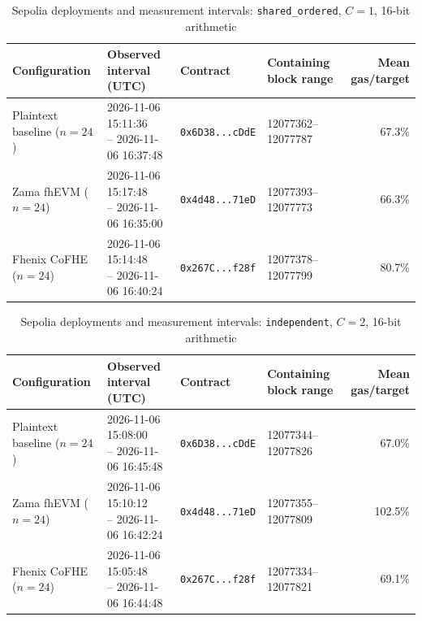 \begin{table}[!t]
\caption{Sepolia deployments and measurement intervals: \texttt{shared\_ordered}, \(C=1\), 16-bit arithmetic}
\label{tab:sepolia-experiment-deployments-concurrency-euint16-concurrency-w16-c1-shared-ordered}
\centering
\footnotesize
\setlength{\tabcolsep}{4pt}
\begin{tabular}{|l|l|l|l|r|}
\hline
\textbf{Configuration} &
\textbf{Observed interval (UTC)} &
\textbf{Contract} &
\textbf{Containing block range} &
\textbf{Mean gas/target} \\
\hline
Plaintext baseline (\(n=24\)) &
\shortstack[l]{2026-11-06 15:11:36 \\ -- 2026-11-06 16:37:48} &
\texttt{0x6D38...cDdE} &
12077362--12077787 &
67.3\% \\
\hline
Zama fhEVM (\(n=24\)) &
\shortstack[l]{2026-11-06 15:17:48 \\ -- 2026-11-06 16:35:00} &
\texttt{0x4d48...71eD} &
12077393--12077773 &
66.3\% \\
\hline
Fhenix CoFHE (\(n=24\)) &
\shortstack[l]{2026-11-06 15:14:48 \\ -- 2026-11-06 16:40:24} &
\texttt{0x267C...f28f} &
12077378--12077799 &
80.7\% \\
\hline
\end{tabular}
\end{table}

\begin{table}[!t]
\caption{Sepolia deployments and measurement intervals: \texttt{independent}, \(C=2\), 16-bit arithmetic}
\label{tab:sepolia-experiment-deployments-concurrency-euint16-concurrency-w16-c2-independent}
\centering
\footnotesize
\setlength{\tabcolsep}{4pt}
\begin{tabular}{|l|l|l|l|r|}
\hline
\textbf{Configuration} &
\textbf{Observed interval (UTC)} &
\textbf{Contract} &
\textbf{Containing block range} &
\textbf{Mean gas/target} \\
\hline
Plaintext baseline (\(n=24\)) &
\shortstack[l]{2026-11-06 15:08:00 \\ -- 2026-11-06 16:45:48} &
\texttt{0x6D38...cDdE} &
12077344--12077826 &
67.0\% \\
\hline
Zama fhEVM (\(n=24\)) &
\shortstack[l]{2026-11-06 15:10:12 \\ -- 2026-11-06 16:42:24} &
\texttt{0x4d48...71eD} &
12077355--12077809 &
102.5\% \\
\hline
Fhenix CoFHE (\(n=24\)) &
\shortstack[l]{2026-11-06 15:05:48 \\ -- 2026-11-06 16:44:48} &
\texttt{0x267C...f28f} &
12077334--12077821 &
69.1\% \\
\hline
\end{tabular}
\end{table}

